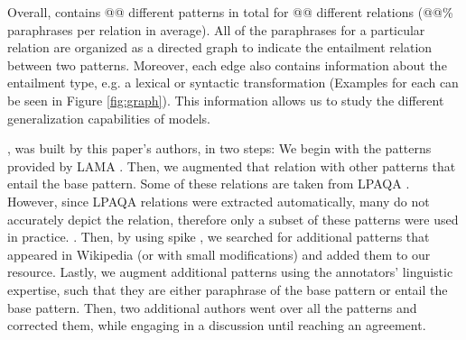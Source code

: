 Overall, \resource{} contains @@ different patterns in total for @@ different relations (@@\% paraphrases per relation in average). All of the paraphrases for a particular relation are organized as a directed graph to indicate the entailment relation between two patterns. Moreover, each edge also contains information about the entailment type, e.g. a lexical or syntactic transformation (Examples for each can be seen in Figure \ref{fig:graph}).
This information allows us to study the different generalization capabilities of models.

\resource{}, was built by this paper's authors, in two steps:
We begin with the patterns provided by LAMA \cite{lama}. Then, we augmented that relation with other patterns that entail the base pattern. Some of these relations are taken from LPAQA \cite{jiang2020can}. However, since LPAQA relations were extracted automatically, many do not accurately depict the relation, therefore only a subset of these patterns were used in practice. 
. 
Then, by using spike \cite{spike}, we searched for additional patterns that appeared in Wikipedia (or with small modifications) and added them to our resource. Lastly, we augment additional patterns using the annotators' linguistic expertise, such that they are either paraphrase of the base pattern or entail the base pattern. 
Then, two additional authors went over all the patterns and corrected them, while engaging in a discussion until reaching an agreement.
 

